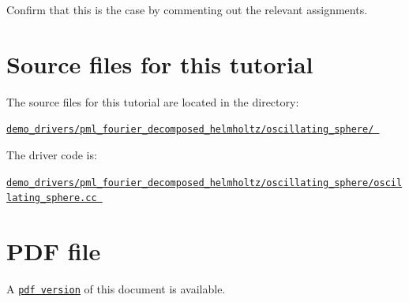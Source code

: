 Confirm that this is the case by commenting out the relevant assignments.



 

\hypertarget{index_sources}{}\section{Source files for this tutorial}\label{index_sources}

\begin{DoxyItemize}
\item The source files for this tutorial are located in the directory\+: \begin{center} \href{../../../../demo_drivers/pml_fourier_decomposed_helmholtz/oscillating_sphere}{\tt demo\+\_\+drivers/pml\+\_\+fourier\+\_\+decomposed\+\_\+helmholtz/oscillating\+\_\+sphere/ } \end{center} 
\item The driver code is\+: \begin{center} \href{../../../../demo_drivers/pml_fourier_decomposed_helmholtz/oscillating_sphere/oscillating_sphere.cc}{\tt demo\+\_\+drivers/pml\+\_\+fourier\+\_\+decomposed\+\_\+helmholtz/oscillating\+\_\+sphere/oscillating\+\_\+sphere.\+cc } \end{center} 
\end{DoxyItemize}

 

 \hypertarget{index_pdf}{}\section{P\+D\+F file}\label{index_pdf}
A \href{../latex/refman.pdf}{\tt pdf version} of this document is available. 
